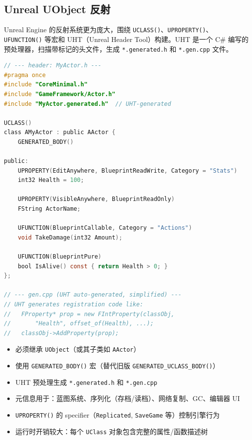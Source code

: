 \documentclass[12pt,a4paper,fontset=fandol]{ctexbook}
\begin{document}
\subsection{Unreal UObject 反射}\label{subsec:ue}

Unreal Engine 的反射系统更为庞大，围绕 \texttt{UCLASS()}、\texttt{UPROPERTY()}、\texttt{UFUNCTION()} 等宏和 UHT（Unreal Header Tool）构建。UHT 是一个 C\# 编写的预处理器，扫描带标记的头文件，生成 \texttt{*.generated.h} 和 \texttt{*.gen.cpp} 文件。

\begin{lstlisting}[language=C,caption={Unreal UObject: 属性与函数反射}]
// --- header: MyActor.h ---
#pragma once
#include "CoreMinimal.h"
#include "GameFramework/Actor.h"
#include "MyActor.generated.h"  // UHT-generated

UCLASS()
class AMyActor : public AActor {
    GENERATED_BODY()

public:
    UPROPERTY(EditAnywhere, BlueprintReadWrite, Category = "Stats")
    int32 Health = 100;

    UPROPERTY(VisibleAnywhere, BlueprintReadOnly)
    FString ActorName;

    UFUNCTION(BlueprintCallable, Category = "Actions")
    void TakeDamage(int32 Amount);

    UFUNCTION(BlueprintPure)
    bool IsAlive() const { return Health > 0; }
};

// --- gen.cpp (UHT auto-generated, simplified) ---
// UHT generates registration code like:
//   FProperty* prop = new FIntProperty(classObj,
//       "Health", offset_of(Health), ...);
//   classObj->AddProperty(prop);
\end{lstlisting}

\begin{note}[title={Unreal 反射要点}]
\begin{itemize}[nosep]
  \item 必须继承 \texttt{UObject}（或其子类如 \texttt{AActor}）
  \item 使用 \texttt{GENERATED\_BODY()} 宏（替代旧版 \texttt{GENERATED\_UCLASS\_BODY()}）
  \item UHT 预处理生成 \texttt{*.generated.h} 和 \texttt{*.gen.cpp}
  \item 元信息用于：蓝图系统、序列化（存档/读档）、网络复制、GC、编辑器 UI
  \item \texttt{UPROPERTY()} 的 specifier（\texttt{Replicated}, \texttt{SaveGame} 等）控制引擎行为
  \item 运行时开销较大：每个 \texttt{UClass} 对象包含完整的属性/函数描述树
\end{itemize}
\end{note}
\end{document}
